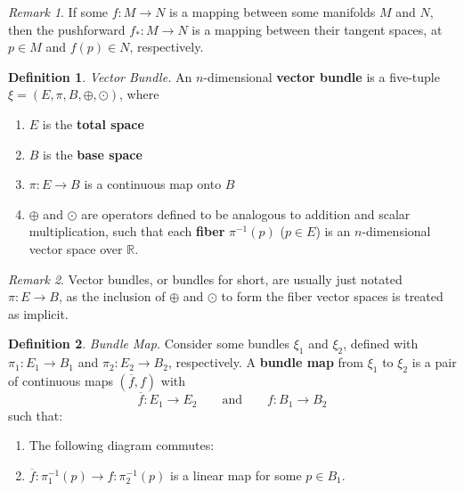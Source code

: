 \documentclass[10pt,landscape]{article}
\theoremstyle{definition}
\newtheorem{definition}{Definition}[section]
\theoremstyle{theorem}
\theoremstyle{summary}
\theoremstyle{remark}
\newtheorem*{remark}{Remark}
\newcommand{\R}{\mathbb{R}}
\begin{document}
\begin{multicols*}{3}
\begin{remark}
    If some $f:M\rightarrow N$ is a mapping between some manifolds $M$ and $N$, then the pushforward $f_*:M\rightarrow N$ is a mapping between their tangent spaces, at $p\in M$ and $f(p)\in N$, respectively.
\end{remark}

\theoremstyle{definition}
\begin{definition}{\textit{Vector Bundle.}}
    An $n$-dimensional \textbf{vector bundle} is a five-tuple $\xi=(E,\pi,B,\oplus, \odot)$, where
    \begin{enumerate}
        \item $E$ is the \textbf{total space}
        \item $B$ is the \textbf{base space}
        \item $\pi:E\rightarrow B$ is a continuous map onto $B$
        \item $\oplus$ and $\odot$ are operators defined to be analogous to addition and scalar multiplication, such that each \textbf{fiber} $\pi^{-1}(p)$ ($p\in E$) is an $n$-dimensional vector space over $\R$.
    \end{enumerate}
    \end{definition}
    
    \begin{remark}
    Vector bundles, or bundles for short, are usually just notated $\pi: E\rightarrow B$, as the inclusion of $\oplus$ and $\odot$ to form the fiber vector spaces is treated as implicit.
    \end{remark}


\theoremstyle{definition}
\begin{definition}{\textit{Bundle Map.}}
    Consider some bundles $\xi_1$ and $\xi_2$, defined with $\pi_1: E_1\rightarrow B_1$ and $\pi_2: E_2\rightarrow B_2$, respectively. A \textbf{bundle map} from $\xi_1$ to $\xi_2$ is a pair of continuous maps $(\overline{f}, f)$ with
    \begin{equation}
        \overline{f}:E_1\rightarrow E_2 \qquad \text{and} \qquad f:B_1\rightarrow B_2
    \end{equation}
    such that:
    \begin{enumerate}
        \item The following diagram commutes:
            \centering
        \item $\overline{f}:\pi_1^{-1}(p)\rightarrow f:\pi_2^{-1}(p)$ is a linear map for some $p\in B_1$.
    \end{enumerate}
\end{definition}


\end{multicols*}
\end{document}
